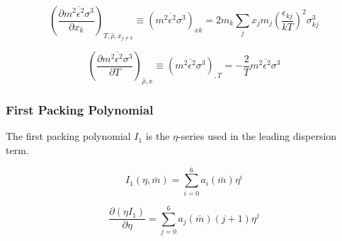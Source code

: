 \documentclass[12pt, letterpaper]{article}
\begin{document}
\begin{equation}
    \left(\frac{\partial\overline{m^{2}\epsilon^{2}\sigma^{3}}}{\partial x_{k}}\right)_{T,\hat{\rho},x_{j\neq k}}
    \equiv (\overline{m^2\epsilon^2\sigma^3})_{xk}
    =2m_{k}\sum_{j}x_{j}m_{j}\left(\frac{\epsilon_{kj}}{kT}\right)^2\sigma_{kj}^3
    \label{eq:m2eps2sigma3_xk}
\end{equation}


\begin{equation}
    \left(\frac{\partial\overline{m^{2}\epsilon^{2}\sigma^{3}}}{\partial T}\right)_{\hat{\rho},x}
    \equiv \left(\overline{m^{2}\epsilon^{2}\sigma^{3}}\right)_{,T}
    =-\frac{2}{T}\overline{m^{2}\epsilon^{2}\sigma^{3}}
    \label{eq:m2eps2sigma3_dT}
\end{equation}

\subsubsection{First Packing Polynomial}

The first packing polynomial \(I_1\) is the \(\eta\)-series used in the leading dispersion term.

\begin{equation}
    I_{1}(\eta, \bar{m})=\sum_{i=0}^6 a_{i}(\bar{m}) \eta^i
    \label{eq:i1_disp}
\end{equation}


\begin{equation}
    \frac{\partial(\eta I_{1})}{\partial\eta}=\sum_{j=0}^6a_{j}(\bar{m})(j+1)\eta^j
    \label{eq:deta_i1_deta}
\end{equation}
\end{document}
